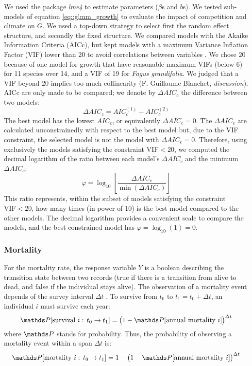 We used the package \textit{lme4} \citep{lme4} to estimate parameters ($ \beta
$s and $ b $s). We tested sub-models of equation \eqref{eq::glmm_growth} to evaluate the
impact of competition and climate on $ G $. We
used a top-down strategy to select first the
random effect structure, and secondly the fixed structure. We compared models
with the Akaike Information Criteria (AICc), but kept models with a maximum
Variance Inflation Factor (VIF) lower than $ 20 $ to avoid correlations between variables \citep{Zuur2010}. We chose $ 20 $ because of one model for growth that have reasonable maximum VIFs (below 6) for 11 species over 14, and a VIF of 19 for \textit{Fagus grandifolia}. We judged that a VIF beyond $ 20 $ implies too much collinearity (F. Guillaume Blanchet, \textit{discussion}). AICc are only made to be compared; we denote by $ \Delta AIC_c $ the difference between two models:
\[
	\Delta AIC_c = AIC_c^{(1)} - AIC_c^{(2)}
\]
The best model has the lowest $ AIC_c $, or equivalently $ \Delta AIC_c = 0 $. The $ \Delta AIC_c $ are calculated unconstrainedly with respect to the best model but, due to the VIF constraint, the selected model is not the model with $ \Delta AIC_c = 0 $. Therefore, using exclusively the models satisfying the constraint $ \text{VIF} < 20 $, we computed the decimal logarithm of the ratio between each model's $ \Delta AIC_c $ and the minimum $ \Delta AIC_c $:
\begin{equation} \label{eq::ratio}
	\varphi = \log_{10}\left[ \frac{\Delta AIC_c}{\min \left( \Delta AIC_c \right)} \right]
\end{equation}
This ratio represents, within the subset of models satisfying the constraint $ \text{VIF} < 20 $, how many times (in power of 10) is the best model compared to the other models. The decimal logarithm provides a convenient scale to compare the models, and the best constrained model has $ \varphi = \log_{10}(1) = 0 $.

\subsubsection{Mortality}

For the mortality rate, the response variable $ Y $ is a boolean describing the transition state between two records
(true if there is a transition from alive to dead, and false if the
individual stays alive). The observation of a mortality event depends of the survey interval $ \Delta t $ \citep{Lines2010}. To survive from $ t_0 $ to $ t_1 = t_0 + \Delta t $, an individual $ i $ must survive each year:
\[
	\Prob[\text{survival } i: \, t_0 \to t_1] = \big(1 - \Prob[\text{annual mortality } i]\big)^{\Delta t}
\]
where $ \Prob $ stands for probability. Thus, the probability of observing a mortality event within a span $ \Delta t $ is:
\[
	\Prob[\text{mortality } i: \, t_0 \to t_1] = 1 - \big(1 - \Prob[\text{annual mortality } i]\big)^{\Delta t}
\]


